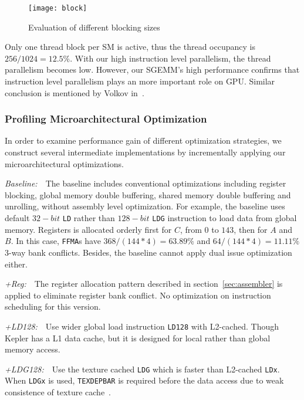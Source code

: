 \begin{figure}[htbp]
\begin{center}
\texttt{[image: block]}
    \caption{Evaluation of different blocking sizes}
\label{fig:block}
\end{center}
\end{figure}

Only one thread block per SM is active, thus the thread occupancy is $256/1024=12.5\%$.
With our high instruction level parallelism, the thread parallelism becomes low.
However, our SGEMM's high performance confirms that instruction level parallelism plays an more important role on GPU.
Similar conclusion is mentioned by Volkov in~\cite{volkov2010better}.

\subsubsection{Profiling Microarchitectural Optimization}
In order to examine performance gain of different optimization strategies, we construct several intermediate 
implementations by incrementally applying our microarchitectural optimizations.

{\it Baseline:}~~The baseline includes conventional optimizations including register blocking, global
memory double buffering, shared memory double buffering and unrolling, without assembly level optimization.
For example, the baseline uses default $32-bit$ {\tt LD} rather than $128-bit$ {\tt LDG} instruction to load data from global memory.
Registers is allocated orderly first for $C$, from $0$ to $143$, then for $A$ and $B$. 
In this case, {\tt FFMA}s have $368/(144*4)=63.89\%$  and $64/(144*4)=11.11\%$ 3-way bank conflicts. 
Besides, the baseline cannot apply dual issue optimization either.

{\it +Reg:}~~The register allocation pattern described in section~\ref{sec:assembler} is applied to eliminate register bank conflict. 
No optimization on instruction scheduling for this version.

{\it +LD128:}~~Use wider global load instruction {\tt LD128} with L2-cached.
Though Kepler has a L1 data cache, but it is designed for local rather than global memory access. ~\cite{xx}

{\it +LDG128:}~~Use the texture cached {\tt LDG} which is faster than L2-cached {\tt LDx}. 
When {\tt LDGx} is used, {\tt TEXDEPBAR} is required before the data access due to weak consistence of texture cache~\cite{lukyanov2014efficient}.

